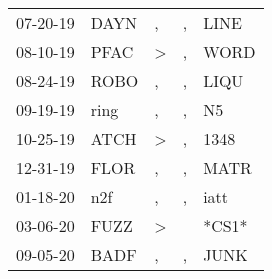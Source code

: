 \begin{supertabular}{lllll}
 07-20-19 &   DAYN &                , &             , &   LINE \\
 08-10-19 &   PFAC &     \textgreater &             , &   WORD \\
 08-24-19 &   ROBO &                , &             , &   LIQU \\
 09-19-19 &   ring &                , &             , &     N5 \\
 10-25-19 &   ATCH &     \textgreater &             , &   1348 \\
 12-31-19 &   FLOR &                , &             , &   MATR \\
 01-18-20 &    n2f &                , &             , &   iatt \\
 03-06-20 &   FUZZ &     \textgreater &               &  *CS1* \\
 09-05-20 &   BADF &                , &             , &   JUNK \\
\end{supertabular}
